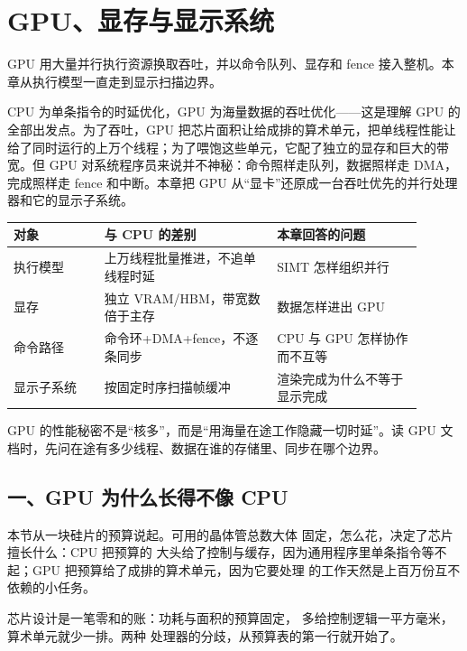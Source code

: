 \chapter{GPU、显存与显示系统}

\begin{keyidea}
GPU 用大量并行执行资源换取吞吐，并以命令队列、显存和 fence 接入整机。本章从执行模型一直走到显示扫描边界。
\end{keyidea}

CPU 为单条指令的时延优化，GPU 为海量数据的吞吐优化——这是理解 GPU 的全部出发点。为了吞吐，GPU 把芯片面积让给成排的算术单元，把单线程性能让给了同时运行的上万个线程；为了喂饱这些单元，它配了独立的显存和巨大的带宽。但 GPU 对系统程序员来说并不神秘：命令照样走队列，数据照样走 DMA，完成照样走 fence 和中断。本章把 GPU 从“显卡”还原成一台吞吐优先的并行处理器和它的显示子系统。

\begin{longtable}{L{0.2\linewidth}L{0.38\linewidth}L{0.32\linewidth}}
\toprule
对象 & 与 CPU 的差别 & 本章回答的问题 \\
\midrule
执行模型 & 上万线程批量推进，不追单线程时延 & SIMT 怎样组织并行 \\\tablerowrule
显存 & 独立 VRAM/HBM，带宽数倍于主存 & 数据怎样进出 GPU \\\tablerowrule
命令路径 & 命令环+DMA+fence，不逐条同步 & CPU 与 GPU 怎样协作而不互等 \\\tablerowrule
显示子系统 & 按固定时序扫描帧缓冲 & 渲染完成为什么不等于显示完成 \\
\bottomrule
\end{longtable}

\begin{keyidea}
GPU 的性能秘密不是“核多”，而是“用海量在途工作隐藏一切时延”。读 GPU 文档时，先问在途有多少线程、数据在谁的存储里、同步在哪个边界。
\end{keyidea}

\section{一、GPU 为什么长得不像 CPU}

本节从一块硅片的预算说起。可用的晶体管总数大体
固定，怎么花，决定了芯片擅长什么：CPU 把预算的
大头给了控制与缓存，因为通用程序里单条指令等不
起；GPU 把预算给了成排的算术单元，因为它要处理
的工作天然是上百万份互不依赖的小任务。

芯片设计是一笔零和的账：功耗与面积的预算固定，
多给控制逻辑一平方毫米，算术单元就少一排。两种
处理器的分歧，从预算表的第一行就开始了。

